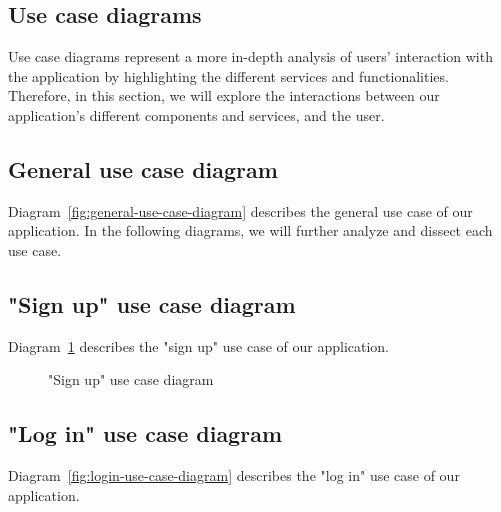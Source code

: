 \begin{toexclude}
	\section{Use case diagrams}

	Use case diagrams represent a more in-depth analysis of users' interaction with the application by highlighting the different services and functionalities. Therefore, in this section, we will explore the interactions between our application's different components and services, and the user.

	\subsection{General use case diagram}
	Diagram~\ref{fig:general-use-case-diagram} describes the general use case of our application.
	In the following diagrams, we will further analyze and dissect each use case.

	
	\subsection{"Sign up" use case diagram}
	Diagram~\ref{fig:signup-use-case-diagram} describes the "sign up" use case of our application.

	\begin{figure}[H]
		\centerfloat
		\sffamily

		\caption{"Sign up" use case diagram}
		\label{fig:signup-use-case-diagram}
	\end{figure}

	\subsection{"Log in" use case diagram}
	Diagram~\ref{fig:login-use-case-diagram} describes the "log in" use case of our application.

	\begin{figure}[H]
		\centerfloat
		\sffamily
\end{figure}
\end{toexclude}
